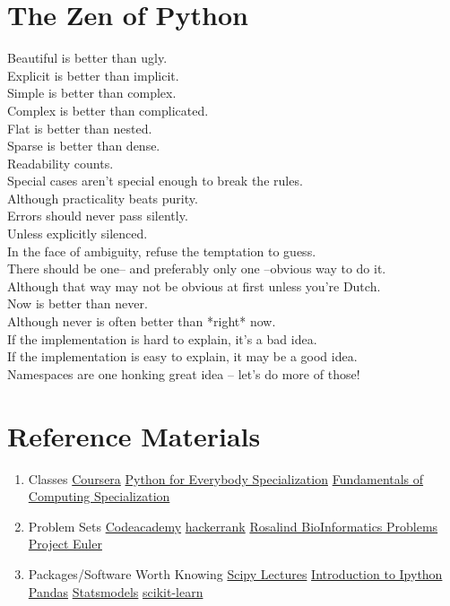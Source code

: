 \documentclass{article}
\begin{document}
	\section{The Zen of Python}
	 Beautiful is better than ugly. \\
	 Explicit is better than implicit. \\
	 Simple is better than complex.\\
	 Complex is better than complicated. \\
	 Flat is better than nested.\\
	 Sparse is better than dense.\\
	 Readability counts.\\
	 Special cases aren't special enough to break the rules.\\
	 Although practicality beats purity.\\
	 Errors should never pass silently.\\
	 Unless explicitly silenced.\\
	 In the face of ambiguity, refuse the temptation to guess.\\
	 There should be one-- and preferably only one --obvious way to do it.\\
	 Although that way may not be obvious at first unless you're Dutch.\\
	 Now is better than never.\\
	 Although never is often better than *right* now.\\
	 If the implementation is hard to explain, it's a bad idea.\\
	 If the implementation is easy to explain, it may be a good idea.\\
	 Namespaces are one honking great idea -- let's do more of those!	\\	
	\section{Reference Materials}
	\begin{enumerate}
		\item Classes
			\subitem \href{www.coursera.org}{Coursera}
			\subsubitem \href{www.coursera.org/specializations/python}{Python for Everybody Specialization}
			\subsubitem \href{www.coursera.org/specializations/fundamentalscomputing2}{Fundamentals of Computing Specialization}
		\item Problem Sets
			\subitem \href{www.codeacademy.com}{Codeacademy}
			\subitem \href{www.hackerrank.com}{hackerrank}
			\subitem \href{rosalind.info/problems/locations}{Rosalind BioInformatics Problems}
			\subitem \href{www.projecteuler.net}{Project Euler}
		\item Packages/Software Worth Knowing
			\subitem \href{www.scipy-lectures.org}{Scipy Lectures}
			\subitem \href{ipython-books.github.io/cookbook}{Introduction to Ipython}
			\subitem \href{pandas.pydata.org}{Pandas}
			\subitem \href{statsmodels.sourceforge.net}{Statsmodels}
			\subitem \href{scikit-learn.org/stable}{scikit-learn}
	\end{enumerate}
	
\end{document}
